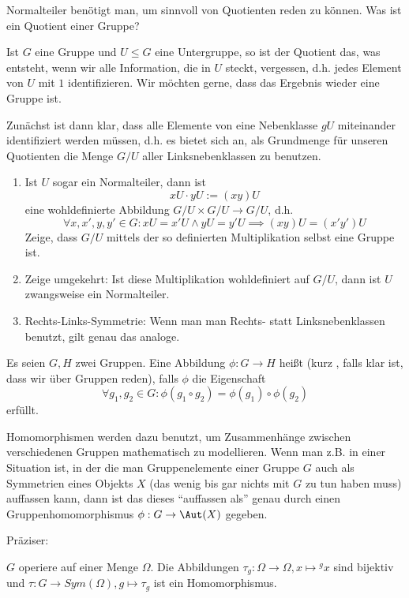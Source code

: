 \begin{sheet}
\begin{problem}[title={Quotientengruppen}, difficulty={fortgeschritten}]
Normalteiler benötigt man, um sinnvoll von Quotienten reden zu können. Was ist ein Quotient einer Gruppe?

Ist $G$ eine Gruppe und $U\leq G$ eine Untergruppe, so ist der Quotient das, was entsteht, wenn wir alle Information, die in $U$ steckt, vergessen, d.h. jedes Element von $U$ mit $1$ identifizieren. Wir möchten gerne, dass das Ergebnis wieder eine Gruppe ist.

Zunächst ist dann klar, dass alle Elemente von eine Nebenklasse $gU$ miteinander identifiziert werden müssen, d.h. es bietet sich an, als Grundmenge für unseren Quotienten die Menge $G/U$ aller Linksnebenklassen zu benutzen.
\begin{enumerate}
\item Ist $U$ sogar ein Normalteiler, dann ist
\[xU \cdot yU := (xy)U\]
eine wohldefinierte Abbildung $G/U \times G/U \to G/U$, d.h.
\[\forall x,x',y,y'\in G: xU=x'U \wedge yU=y'U \implies (xy)U = (x'y')U\]
Zeige, dass $G/U$ mittels der so definierten Multiplikation selbst eine Gruppe ist.
\item Zeige umgekehrt: Ist diese Multiplikation wohldefiniert auf $G/U$, dann ist $U$ zwangsweise ein Normalteiler.
\item Rechts-Links-Symmetrie: Wenn man man Rechts- statt Linksnebenklassen benutzt, gilt genau das analoge.
\end{enumerate}
\end{problem}



\begin{problem}[title={Gruppenhomomorphismen}]
Es seien $G,H$ zwei Gruppen. Eine Abbildung $\phi: G\to H$ heißt  (kurz , falls klar ist, dass wir über Gruppen reden), falls $\phi$ die Eigenschaft
\[\forall g_1,g_2\in G: \phi(g_1\circ g_2) = \phi(g_1)\circ \phi(g_2)\]
erfüllt.

Homomorphismen werden dazu benutzt, um Zusammenhänge zwischen verschiedenen Gruppen mathematisch zu modellieren. Wenn man z.B. in einer Situation ist, in der die man Gruppenelemente einer Gruppe $G$ auch als Symmetrien eines Objekts $X$ (das wenig bis gar nichts mit $G$ zu tun haben muss) auffassen kann, dann ist das dieses \enquote{auffassen als} genau durch einen Gruppenhomomorphismus $\phi: G\to\Aut(X)$ gegeben.

Präziser:
\begin{subproblem}
$G$ operiere auf einer Menge $\Omega$. Die Abbildungen $\tau_g: \Omega\to\Omega, x\mapsto{^g x}$ sind bijektiv und $\tau: G\to Sym(\Omega), g\mapsto\tau_g$ ist ein Homomorphismus.


\end{subproblem}
\end{problem}
\end{sheet}
